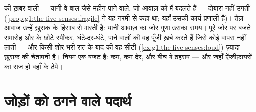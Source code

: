 \begin{proposition}[ज़ोर की आवाज़ एक ख़ुराक है]\label{prop:g8:protecting-the-nervous-system:noise}
 की ख़बर वाली  --- यानी वे बाल जैसे महीन पाने वाले, जो आवाज़
को  में बदलते हैं --- दोबारा नहीं उगतीं
(\cref{prop:g1:the-five-senses:fragile} ने यह नरमी से कहा था; यहाँ उसकी
कार्य-प्रणाली है)। तेज़ आवाज़ उन्हें ख़ुराक के हिसाब से मारती है: यानी
आवाज़ का ज़ोर गुणा उसका समय। पूरे ज़ोर पर बजते समारोह और  के छोटे
स्पीकर, घंटे-दर-घंटे, पाने वालों की वह पूँजी ख़र्च करते हैं जिसे कोई
 वापस नहीं लाती --- और किसी शोर भरी रात के बाद की वह सीटी
(\cref{ex:g1:the-five-senses:loud}) ज़्यादा ख़ुराक की चेतावनी है। नियम
एक बजट है: कम, कम देर, और बीच में ठहराव --- और जहाँ ऐंप्लीफ़ायरों का
राज हो वहाँ  के ठेपे।
\end{proposition}
\admitted

\section{जोड़ों को ठगने वाले पदार्थ}

